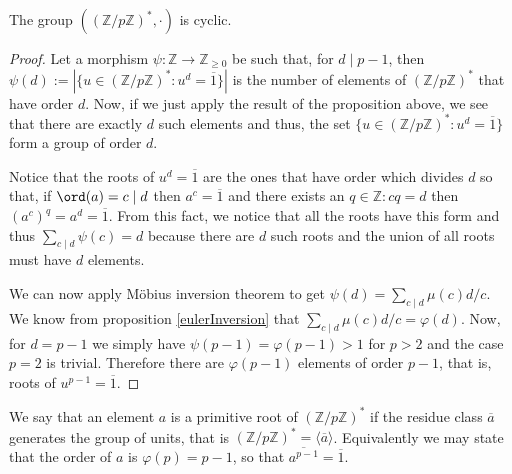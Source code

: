 \begin{theorem}\label{unitCyclic}
   The group \(((\mathbb{Z}/p\mathbb{Z})^\ast, \cdot)\) is cyclic.
\end{theorem}

\begin{proof}
   Let a morphism \(\psi : \mathbb{Z} \to \mathbb{Z}_{\geqslant 0}\) be such
   that, for \(d \mid p-1\), then \(\psi(d) := |\{u \in
   (\mathbb{Z}/p\mathbb{Z})^\ast : u^d = \overline{1}\}|\) is the number of
   elements of \((\mathbb{Z}/p\mathbb{Z})^\ast\) that have order \(d\). Now, if
   we just apply the result of the proposition above, we see that there are
   exactly \(d\) such elements and thus, the set \(\{u \in
   (\mathbb{Z}/p\mathbb{Z})^\ast : u^d = \overline{1}\}\) form a group of order
   \(d\). 

   Notice that the roots of \(u^d = \overline{1}\) are the ones that have
   order which divides \(d\) so that, if \(\ord(a) = c \mid d\) then  \(a^c =
   \overline{1}\) and there exists an \(q \in \mathbb{Z} : cq = d\) then
   \((a^c)^q = a^d = \overline{1}\). From this fact, we notice that all the
   roots have this form and thus \(\sum_{c \mid d} \psi(c) = d\) because there
   are \(d\) such roots and the union of all roots must have \(d\) elements. 

   We can now apply Möbius inversion theorem to get \(\psi(d) = \sum_{c \mid d}
   \mu(c) d/c\). We know from proposition \ref{eulerInversion} that \(\sum_{c
   \mid d} \mu(c)d/c = \varphi(d)\). Now, for \(d = p-1\) we simply have
   \(\psi(p-1) = \varphi(p-1) > 1\) for \(p > 2\) and the case \(p=2\) is
   trivial. Therefore there are \(\varphi(p-1)\) elements of order \(p-1\), that
   is, roots of \(u^{p-1} = \overline{1}\).
\end{proof}

\begin{definition}
   We say that an element \(a\) is a primitive root of
   \((\mathbb{Z}/p\mathbb{Z})^\ast\) if the residue class \(\overline{a}\)
   generates the group of units, that is \((\mathbb{Z}/p\mathbb{Z})^\ast =
   \langle \overline{a} \rangle\). Equivalently we may state that the order of
   \(a\) is \(\varphi(p) = p-1\), so that \(\overline{a^{p-1}} = \overline{1}\).
\end{definition}


